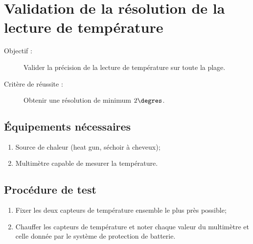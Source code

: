 
\section{Validation de la résolution de la lecture de température}

	\begin{description}
		\item[Objectif :] Valider la précision de la lecture de température sur toute la plage.
		\item[Critère de réussite :] Obtenir une résolution de minimum $2 \degres$.
	\end{description}
	
	\subsection*{Équipements nécessaires}
	\begin{enumerate}
		\item Source de chaleur (heat gun, séchoir à cheveux);
		\item Multimètre capable de mesurer la température.
	\end{enumerate}	
	
	\subsection*{Procédure de test}
	\begin{enumerate}
		\item Fixer les deux capteurs de température ensemble le plus près possible; 
		\item Chauffer les capteurs de température et noter chaque valeur du multimètre et celle donnée par le système de protection de batterie.
	\end{enumerate}